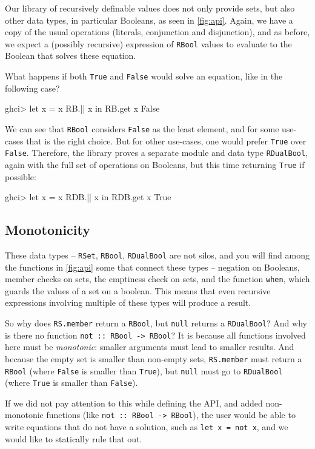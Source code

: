 \documentclass[manuscript,anonymous,screen,acmsmall]{acmart}
\begin{document}
Our library of recursively definable values does not only provide sets, but also other data types, in particular Booleans, as seen in \cref{fig:api}. Again, we have a copy of the usual operations (literals, conjunction and disjunction), and as before, we expect a (possibly recursive) expression of \verb|RBool| values to evaluate to the Boolean that solves these equation.

What happens if both \verb|True| and \verb|False| would solve an equation, like in the following case?
\begin{code}
ghci> let x = x RB.|| x in RB.get x
False
\end{code}
We can see that \verb|RBool| considers \verb|False| as the least element, and for some use-cases that is the right choice. But for other use-cases, one would prefer \verb|True| over \verb|False|. Therefore, the library proves a separate module and data type \verb|RDualBool|, again with the full set of operations on Booleans, but this time returning \verb|True| if possible:
\begin{code}
ghci> let x = x RDB.|| x in RDB.get x
True
\end{code}

\subsection{Monotonicity}\label{sec:monotonicity}

These data types -- \verb|RSet|, \verb|RBool|, \verb|RDualBool| are not silos, and you will find among the functions in \cref{fig:api} some that connect these types -- negation on Booleans, member checks on sets, the emptiness check on sets, and the function \verb|when|, which guards the values of a set on a boolean.
This means that even recursive expressions involving multiple of these types will produce a result.

So why does \verb|RS.member| return a \verb|RBool|, but \verb|null| returns a \verb|RDualBool|? And why is there no function \verb|not :: RBool -> RBool|? It is because all functions involved here must be \emph{monotonic}: smaller arguments must lead to smaller results. And because the empty set is smaller than non-empty sets, \verb|RS.member| must return a \verb|RBool| (where \verb|False| is smaller than \verb|True|), but \verb|null| must go to \verb|RDualBool| (where \verb|True| is smaller than \verb|False|).

If we did not pay attention to this while defining the API, and added non-monotonic functions (like \verb|not :: RBool -> RBool|), the user would be  able to write equations that do not have a solution, such as
\verb|let x = not x|,
and we would like to statically rule that out.
\end{document}
